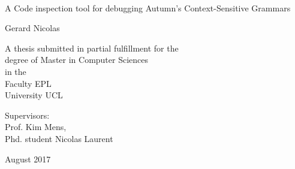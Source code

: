 \documentclass[11pt,a4paper,oldfontcommands]{memoir}
\begin{document}
%
%
\thispagestyle{empty}

{%
\sffamily
\centering
\Large

~\vspace{\fill}

{\huge 
A Code inspection tool for debugging Autumn's Context-Sensitive Grammars
}

\vspace{2.5cm}

{\LARGE
Gerard Nicolas
}

\vspace{3.5cm}

A thesis submitted in partial fulfillment for the\\
degree of Master in Computer Sciences\\[1em]
in the\\[1em]
Faculty EPL\\
University UCL

\vspace{3.5cm}

Supervisors: \\Prof. Kim Mens, \\Phd. student Nicolas Laurent

\vspace{\fill}

August 2017

}%

\cleardoublepage

\tableofcontents

\clearpage




\end{document}
